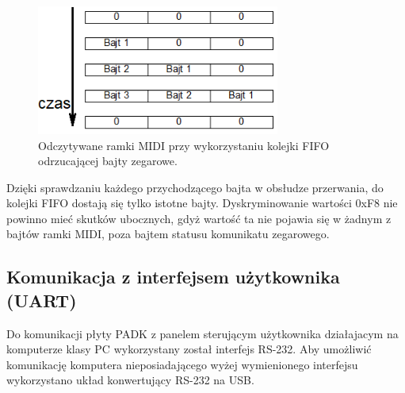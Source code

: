 \begin{figure}[H]
	\centering
	\includegraphics[width=8cm]{./grafiki/real_fifo}
	\captionsetup{justification=centering}
	\caption{Odczytywane ramki MIDI przy wykorzystaniu kolejki FIFO odrzucającej bajty zegarowe.}
	\label{rys:real_fifo}
\end{figure} 
Dzięki sprawdzaniu każdego przychodzącego bajta w obsłudze przerwania, do kolejki FIFO dostają się tylko istotne bajty. Dyskryminowanie wartości 0xF8 nie powinno mieć skutków ubocznych, gdyż wartość ta nie pojawia się w żadnym z bajtów ramki MIDI, poza bajtem statusu komunikatu zegarowego.

\subsection{Komunikacja z interfejsem użytkownika (UART)}\label{sec:real_komunikacja}
Do komunikacji płyty PADK z panelem sterującym użytkownika działajacym na komputerze klasy PC wykorzystany został interfejs RS-232. Aby umożliwić komunikację komputera nieposiadającego wyżej wymienionego interfejsu wykorzystano układ konwertujący RS-232 na USB.


